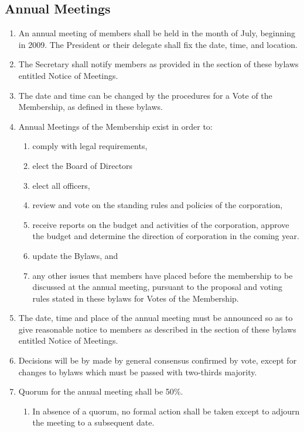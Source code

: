 \documentclass{article}
\begin{document}
\subsection{Annual Meetings}
\begin{enumerate}
    \item An annual meeting of members shall be held in the month of July,
    beginning in 2009. The President or their delegate shall fix the date, time,
    and location.
    \item The Secretary shall notify members as provided in the section of these
    bylaws entitled Notice of Meetings.
    \item The date and time can be changed by the procedures for a Vote of the
    Membership, as defined in these bylaws.
    \item Annual Meetings of the Membership exist in order to:
    \begin{enumerate}
        \item comply with legal requirements,
        \item elect the Board of Directors
        \item elect all officers,
        \item review and vote on the standing rules and policies of the
corporation,
        \item receive reports on the budget and activities of the corporation,
        approve the budget and determine the direction of corporation in the
        coming year.
        \item update the Bylaws, and
        \item any other issues that members have placed before the membership
        to be discussed at the annual meeting, pursuant to the proposal and
        voting rules stated in these bylaws for Votes of the Membership.
    \end{enumerate}
    \item The date, time and place of the annual meeting must be announced so as
    to give reasonable notice to members as described in the section of these
    bylaws entitled Notice of Meetings.
    \item Decisions will be by made by general consensus confirmed by vote,
    except for changes to bylaws which must be passed with two-thirds majority.
    \item Quorum for the annual meeting shall be 50\%.
    \begin{enumerate}
        \item In absence of a quorum, no formal action shall be taken except to
        adjourn the meeting to a subsequent date.
    \end{enumerate}
\end{enumerate}
\end{document}
